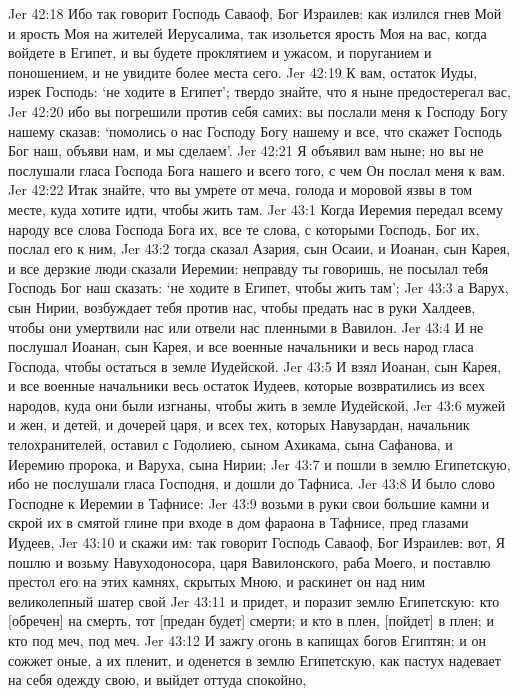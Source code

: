 Jer 42:18  Ибо так говорит Господь Саваоф, Бог Израилев: как излился гнев Мой и ярость Моя на жителей Иерусалима, так изольется ярость Моя на вас, когда войдете в Египет, и вы будете проклятием и ужасом, и поруганием и поношением, и не увидите более места сего.
Jer 42:19  К вам, остаток Иуды, изрек Господь: `не ходите в Египет'; твердо знайте, что я ныне предостерегал вас,
Jer 42:20  ибо вы погрешили против себя самих: вы послали меня к Господу Богу нашему сказав: `помолись о нас Господу Богу нашему и все, что скажет Господь Бог наш, объяви нам, и мы сделаем'.
Jer 42:21  Я объявил вам ныне; но вы не послушали гласа Господа Бога нашего и всего того, с чем Он послал меня к вам.
Jer 42:22  Итак знайте, что вы умрете от меча, голода и моровой язвы в том месте, куда хотите идти, чтобы жить там.
Jer 43:1  Когда Иеремия передал всему народу все слова Господа Бога их, все те слова, с которыми Господь, Бог их, послал его к ним,
Jer 43:2  тогда сказал Азария, сын Осаии, и Иоанан, сын Карея, и все дерзкие люди сказали Иеремии: неправду ты говоришь, не посылал тебя Господь Бог наш сказать: `не ходите в Египет, чтобы жить там';
Jer 43:3  а Варух, сын Нирии, возбуждает тебя против нас, чтобы предать нас в руки Халдеев, чтобы они умертвили нас или отвели нас пленными в Вавилон.
Jer 43:4  И не послушал Иоанан, сын Карея, и все военные начальники и весь народ гласа Господа, чтобы остаться в земле Иудейской.
Jer 43:5  И взял Иоанан, сын Карея, и все военные начальники весь остаток Иудеев, которые возвратились из всех народов, куда они были изгнаны, чтобы жить в земле Иудейской,
Jer 43:6  мужей и жен, и детей, и дочерей царя, и всех тех, которых Навузардан, начальник телохранителей, оставил с Годолиею, сыном Ахикама, сына Сафанова, и Иеремию пророка, и Варуха, сына Нирии;
Jer 43:7  и пошли в землю Египетскую, ибо не послушали гласа Господня, и дошли до Тафниса.
Jer 43:8  И было слово Господне к Иеремии в Тафнисе:
Jer 43:9  возьми в руки свои большие камни и скрой их в смятой глине при входе в дом фараона в Тафнисе, пред глазами Иудеев,
Jer 43:10  и скажи им: так говорит Господь Саваоф, Бог Израилев: вот, Я пошлю и возьму Навуходоносора, царя Вавилонского, раба Моего, и поставлю престол его на этих камнях, скрытых Мною, и раскинет он над ним великолепный шатер свой
Jer 43:11  и придет, и поразит землю Египетскую: кто [обречен] на смерть, тот [предан будет] смерти; и кто в плен, [пойдет] в плен; и кто под меч, под меч.
Jer 43:12  И зажгу огонь в капищах богов Египтян; и он сожжет оные, а их пленит, и оденется в землю Египетскую, как пастух надевает на себя одежду свою, и выйдет оттуда спокойно,
